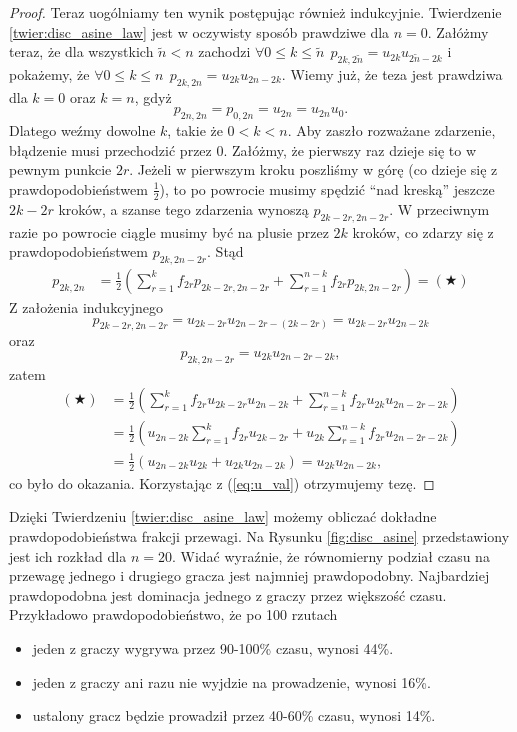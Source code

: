 \documentclass[a4paper,11pt,twoside]{book}
\theoremstyle{definition}
\begin{document}
\begin{proof}
Teraz uogólniamy ten wynik postępując również indukcyjnie. Twierdzenie \ref{twier:disc_asine_law} jest w oczywisty sposób prawdziwe dla $n=0$. Załóżmy teraz, że dla wszystkich $\tilde{n} < n$ zachodzi $\forall 0 \leq k \leq \tilde{n}\ \ p_{2k,2\tilde{n}} = u_{2k} u_{2\tilde{n}-2k}$ i pokażemy, że $\forall 0 \leq k \leq n\ \ p_{2k,2n} = u_{2k} u_{2n-2k}$. 
Wiemy już, że teza jest prawdziwa dla $k = 0$ oraz $k = n$, gdyż
\[  p_{2n,2n} = p_{0,2n} = u_{2n} = u_{2n}u_0. \]
Dlatego weźmy dowolne $k$, takie że $0 < k < n$. Aby zaszło rozważane zdarzenie, błądzenie musi przechodzić przez 0. Załóżmy, że pierwszy raz dzieje się to w pewnym punkcie $2r$. Jeżeli w pierwszym kroku poszliśmy w górę (co dzieje się z prawdopodobieństwem $\frac{1}{2}$), to po powrocie musimy spędzić ``nad kreską'' jeszcze $2k-2r$ kroków, a szanse tego zdarzenia wynoszą $p_{2k-2r, 2n-2r}$. W przeciwnym razie po powrocie ciągle musimy być na plusie przez $2k$ kroków, co zdarzy się z prawdopodobieństwem $p_{2k,2n-2r}$. Stąd
\begin{equation*}
 \begin{split}
  p_{2k,2n} &= \frac{1}{2} \left( \sum_{r=1}^k f_{2r} p_{2k-2r,2n-2r} + \sum_{r=1}^{n-k} f_{2r} p_{2k, 2n-2r} \right) = (\bigstar)
 \end{split}
\end{equation*}
\noindent Z założenia indukcyjnego
\[ p_{2k-2r,2n-2r} = u_{2k-2r}u_{2n-2r - (2k-2r)} = u_{2k-2r}u_{2n-2k} \]
oraz
\[ p_{2k,2n-2r} = u_{2k}u_{2n-2r-2k}, \]
zatem
\begin{equation*}
 \begin{split}
  (\bigstar) &= \frac{1}{2} \left( \sum_{r=1}^k f_{2r} u_{2k-2r}u_{2n-2k} + \sum_{r=1}^{n-k} f_{2r} u_{2k}u_{2n-2r-2k} \right) \\
             &= \frac{1}{2} \left( u_{2n-2k}\sum_{r=1}^k f_{2r} u_{2k-2r} + u_{2k}\sum_{r=1}^{n-k} f_{2r} u_{2n-2r-2k} \right) \\
             &= \frac{1}{2} \left( u_{2n-2k}u_{2k} + u_{2k} u_{2n-2k} \right) = u_{2k} u_{2n-2k},
 \end{split}
\end{equation*}
co było do okazania. Korzystając z (\ref{eq:u_val}) otrzymujemy tezę.
\end{proof}

Dzięki Twierdzeniu \ref{twier:disc_asine_law} możemy obliczać dokładne prawdopodobieństwa frakcji przewagi. Na Rysunku \ref{fig:disc_asine} przedstawiony jest ich rozkład dla $n=20$. Widać wyraźnie, że równomierny podział czasu na przewagę jednego i drugiego gracza jest najmniej prawdopodobny. Najbardziej prawdopodobna jest dominacja jednego z graczy przez większość czasu. Przykładowo prawdopodobieństwo, że po 100 rzutach
\begin{itemize}
 \item jeden z graczy wygrywa przez 90-100\% czasu, wynosi 44\%.
 \item jeden z graczy ani razu nie wyjdzie na prowadzenie, wynosi 16\%.
 \item ustalony gracz będzie prowadził przez 40-60\% czasu, wynosi 14\%.
\end{itemize}
\end{document}
